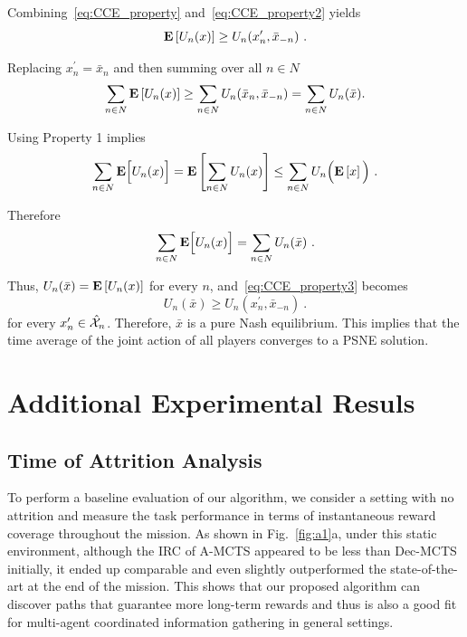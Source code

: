 Combining~\eqref{eq:CCE_property} and~\eqref{eq:CCE_property2} yields
\begin{equation} \label{eq:CCE_property3}
\Er \lsb U_n(x) \rsb \geq U_n(x_n^{\prime}, \bar{x}_{-n}) \ .
\end{equation}

Replacing $x_n^{\prime} = \bar{x}_n$ and then summing over all $n\in N$
\begin{equation}
\sum_{n\in N} \mathbf{E} \left[ U_n(x) \right] \geq \sum_{n \in N} U_n(\bar{x}_n, \bar{x}_{-n}) = \sum_{n\in N} U_n(\bar{x}) \nonumber.
\end{equation}

Using Property 1 implies 
\begin{equation}
\sum_{n \in N} \mathbf{E} \Big[ U_n (x) \Big] = \mathbf{E} \left[ \sum_{n \in N} U_n(x) \right] \leq \sum_{n \in N} U_n \Big( \mathbf{E} \left[ x \right] \Big)\ \nonumber.
\end{equation}

Therefore
$$\sum_{n\in N} \mathbf{E} \Big[ U_n (x) \Big] = \sum_{n \in N}U_n(\bar{x}) \ .$$

Thus, $U_n(\bar{x})=\mathbf{E}\left[ U_n(x)\right]$ for every $n$, and~\eqref{eq:CCE_property3} becomes
$$U_n(\bar{x})\geq U_n(x_n^{\prime}, \bar{x}_{-n})\ .$$
for every $x^{\prime}_n\in\hat{\mathcal{X}}_n$. Therefore, $\bar{x}$ is a pure Nash equilibrium. This implies that the time average of the joint action of all players converges to a PSNE solution.

\section{Additional Experimental Resuls}
\label{app:D}
\subsection{Time of Attrition Analysis}

To perform a baseline evaluation of our algorithm, we consider a setting with no attrition and measure the task performance in terms of instantaneous reward coverage throughout the mission. As shown in Fig.~\ref{fig:a1}a, under this static environment, although the IRC of A-MCTS appeared to be less than Dec-MCTS initially, it ended up comparable and even slightly outperformed the state-of-the-art at the end of the mission. This shows that our proposed algorithm can discover paths that guarantee more long-term rewards and thus is also a good fit for multi-agent coordinated information gathering in general settings. 

